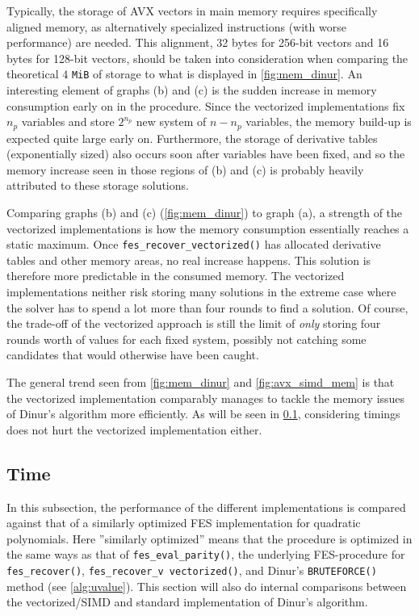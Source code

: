 Typically, the storage of AVX vectors in main memory requires specifically aligned memory, as alternatively specialized instructions (with worse performance) are needed. This alignment, 32 bytes for 256-bit vectors and 16 bytes for 128-bit vectors, should be taken into consideration when comparing the theoretical $4$ \texttt{MiB} of storage to what is displayed in \cref{fig:mem_dinur}. An interesting element of graphs (b) and (c) is the sudden increase in memory consumption early on in the procedure. Since the vectorized implementations fix $n_p$ variables and store $2^{n_p}$ new system of $n - n_p$ variables, the memory build-up is expected quite large early on. Furthermore, the storage of derivative tables (exponentially sized) also occurs soon after variables have been fixed, and so the memory increase seen in those regions of (b) and (c) is probably heavily attributed to these storage solutions. 

Comparing graphs (b) and (c) (\cref{fig:mem_dinur}) to graph (a), a strength of the vectorized implementations is how the memory consumption essentially reaches a static maximum. Once \texttt{fes\_recover\_vectorized()} has allocated derivative tables and other memory areas, no real increase happens. This solution is therefore more predictable in the consumed memory. The vectorized implementations neither risk storing many solutions in the extreme case where the solver has to spend a lot more than four rounds to find a solution. Of course, the trade-off of the vectorized approach is still the limit of \textit{only} storing four rounds worth of values for each fixed system, possibly not catching some candidates that would otherwise have been caught.

The general trend seen from \cref{fig:mem_dinur} and \cref{fig:avx_simd_mem} is that the vectorized implementation comparably manages to tackle the memory issues of Dinur's algorithm more efficiently. As will be seen in \cref{sec:eval:dinur_fes}, considering timings does not hurt the vectorized implementation either.

\subsection{Time} \label{sec:eval:dinur_fes}
In this subsection, the performance of the different implementations is compared against that of a similarly optimized FES implementation for quadratic polynomials. Here ''similarly optimized'' means that the procedure is optimized in the same ways as that of \texttt{fes\_eval\_parity()}, the underlying FES-procedure for \texttt{fes\_recover()}, \texttt{fes\_recover\_v vectorized()}, and Dinur's \texttt{BRUTEFORCE()} method (see \cref{alg:uvalue}). This section will also do internal comparisons between the vectorized/SIMD and standard implementation of Dinur's algorithm. 

